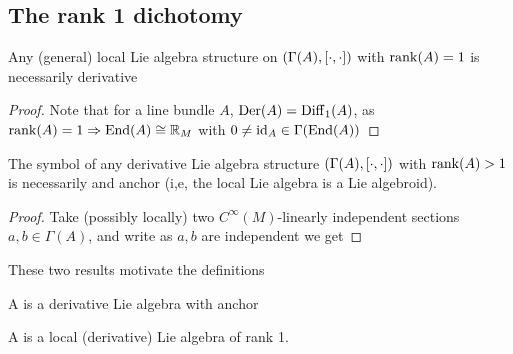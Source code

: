 \documentclass{article}
\begin{document}
\subsection{The rank 1 dichotomy}

\begin{prop}
Any (general) local Lie algebra structure on $(\Gamma(A), \left[ \cdot, \cdot \right])$ with $\operatorname{rank}(A)=1$ is necessarily derivative 
\end{prop}
\begin{proof}
Note that for a line bundle $A$, $\operatorname{Der}(A) = \operatorname{Diff}_1(A)$, as $\operatorname{rank}(A)=1 \Rightarrow \operatorname{End}(A) \cong \mathbb{R}_M$ with $0 \neq \operatorname{id}_A \in \Gamma(\operatorname{End}(A))$
\end{proof}

\begin{prop}
The symbol of any derivative Lie algebra structure $(\Gamma(A), \left[ \cdot, \cdot \right])$ with $\operatorname{rank}(A) >1$ is necessarily and anchor (i,e, the local Lie algebra is a Lie algebroid).
\end{prop}
\begin{proof}
Take (possibly locally) two $C^\infty(M)$-linearly independent sections $a,b \in \Gamma(A)$, and write 
as $a,b$ are independent we get 
\end{proof}

These two results motivate the definitions

\begin{definition}
A  is a derivative Lie algebra with anchor
\end{definition}

\begin{definition}
A  is a local (derivative) Lie algebra of rank 1. 
\end{definition}
\end{document}

